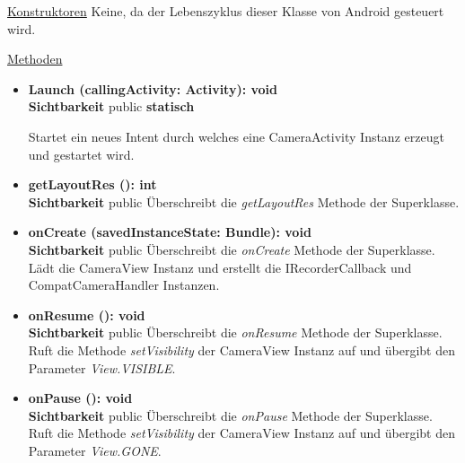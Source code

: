 \underline{Konstruktoren}\newline
\indent Keine, da der Lebenszyklus dieser Klasse von Android gesteuert wird.\newline

\underline{Methoden}
\begin{itemize}
\itemsep0pt

\item \textbf{Launch (callingActivity: Activity): void}\hfill\\
\textbf{Sichtbarkeit} public \newline
\textbf{statisch} 

Startet ein neues Intent durch welches eine CameraActivity Instanz erzeugt und gestartet wird.

\item \textbf{getLayoutRes (): int}\hfill\\
\textbf{Sichtbarkeit} public\newline
Überschreibt die \textit{getLayoutRes} Methode der Superklasse.

\item \textbf{onCreate (savedInstanceState: Bundle): void}\hfill\\
\textbf{Sichtbarkeit} public\newline
Überschreibt die \textit{onCreate} Methode der Superklasse. Lädt die CameraView Instanz und erstellt die IRecorderCallback und CompatCameraHandler Instanzen.

\item \textbf{onResume (): void}\hfill\\
\textbf{Sichtbarkeit} public\newline
Überschreibt die \textit{onResume} Methode der Superklasse. Ruft die Methode \textit{setVisibility} der CameraView Instanz auf und übergibt den Parameter \textit{View.VISIBLE}.

\item \textbf{onPause (): void}\hfill\\
\textbf{Sichtbarkeit} public\newline
Überschreibt die \textit{onPause} Methode der Superklasse. Ruft die Methode \textit{setVisibility} der CameraView Instanz auf und übergibt den Parameter \textit{View.GONE}.

\end{itemize}